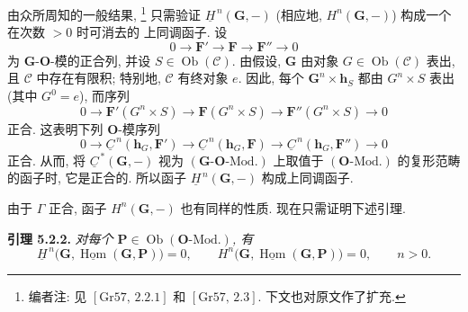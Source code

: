 由众所周知的一般结果,
\footnote{编者注: 见 \([\mathrm{Gr}57,\,2.2.1]\) 和
\([\mathrm{Gr}57,\,2.3]\). 下文也对原文作了扩充.}
只需验证 \(\underline H^{\,n}(\mathbf G,-)\)
(相应地, \(H^n(\mathbf G,-)\)) 构成一个在次数 \(>0\) 时可消去的
上同调函子. 设
\[
  0\longrightarrow\mathbf F'
   \longrightarrow\mathbf F
   \longrightarrow\mathbf F''
   \longrightarrow0
\]
为 \(\mathbf G\)-\(\mathbf O\)-模的正合列, 并设
\(S\in\operatorname{Ob}(\mathscr C)\). 由假设, \(\mathbf G\) 由对象
\(G\in\operatorname{Ob}(\mathscr C)\) 表出, 且 \(\mathscr C\) 中存在有限积;
特别地, \(\mathscr C\) 有终对象 \(e\). 因此, 每个
\(\mathbf G^n\times\mathbf h_S\) 都由 \(G^n\times S\) 表出
(其中 \(G^0=e\)), 而序列
\[
  0\longrightarrow\mathbf F'(G^n\times S)
   \longrightarrow\mathbf F(G^n\times S)
   \longrightarrow\mathbf F''(G^n\times S)
   \longrightarrow0
\]
正合. 这表明下列 \(\mathbf O\)-模序列
\[
  0\longrightarrow\underline C^{\,n}(\mathbf h_G,\mathbf F')
   \longrightarrow\underline C^{\,n}(\mathbf h_G,\mathbf F)
   \longrightarrow\underline C^{\,n}(\mathbf h_G,\mathbf F'')
   \longrightarrow0
\]
正合. 从而, 将 \(\underline C^{\,*}(\mathbf G,-)\) 视为
\((\mathbf G\text{-}\mathbf O\text{-Mod.})\) 上取值于
\((\mathbf O\text{-Mod.})\) 的复形范畴的函子时, 它是正合的.
所以函子 \(\underline H^{\,n}(\mathbf G,-)\) 构成上同调函子.

由于 \(\Gamma\) 正合, 函子 \(H^n(\mathbf G,-)\) 也有同样的性质.
现在只需证明下述引理.

\medskip
\noindent{}\textbf{引理 5.2.2.}
\textit{对每个 \(\mathbf P\in\operatorname{Ob}(\mathbf O\text{-Mod.})\), 有}
\[
  \underline H^{\,n}\bigl(
    \mathbf G,\underline{\operatorname{Hom}}(\mathbf G,\mathbf P)
  \bigr)=0,
  \qquad
  H^n\bigl(
    \mathbf G,\underline{\operatorname{Hom}}(\mathbf G,\mathbf P)
  \bigr)=0,
  \qquad n>0.
\]

